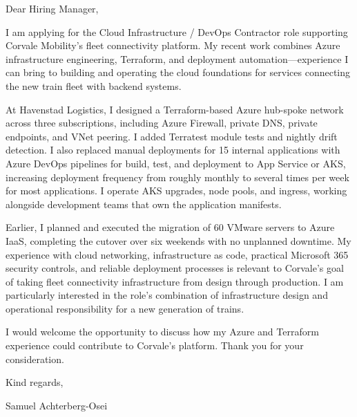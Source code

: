 \documentclass[11pt,a4paper]{article}
\begin{document}
Dear Hiring Manager,

I am applying for the Cloud Infrastructure / DevOps Contractor role supporting Corvale Mobility’s fleet connectivity platform. My recent work combines Azure infrastructure engineering, Terraform, and deployment automation—experience I can bring to building and operating the cloud foundations for services connecting the new train fleet with backend systems.

At Havenstad Logistics, I designed a Terraform-based Azure hub-spoke network across three subscriptions, including Azure Firewall, private DNS, private endpoints, and VNet peering. I added Terratest module tests and nightly drift detection. I also replaced manual deployments for 15 internal applications with Azure DevOps pipelines for build, test, and deployment to App Service or AKS, increasing deployment frequency from roughly monthly to several times per week for most applications. I operate AKS upgrades, node pools, and ingress, working alongside development teams that own the application manifests.

Earlier, I planned and executed the migration of 60 VMware servers to Azure IaaS, completing the cutover over six weekends with no unplanned downtime. My experience with cloud networking, infrastructure as code, practical Microsoft 365 security controls, and reliable deployment processes is relevant to Corvale’s goal of taking fleet connectivity infrastructure from design through production. I am particularly interested in the role’s combination of infrastructure design and operational responsibility for a new generation of trains.

I would welcome the opportunity to discuss how my Azure and Terraform experience could contribute to Corvale’s platform. Thank you for your consideration.

Kind regards,

Samuel Achterberg-Osei
\end{document}
